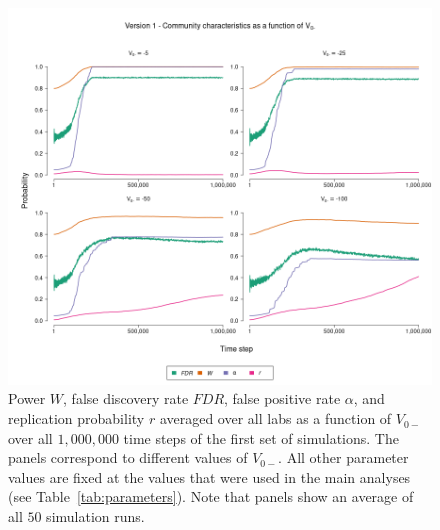 \documentclass[meta, authordate]{jote-new-article}
\begin{document}
%
%
\begin{figure}
  \begin{fullwidth}
    \centering
    \includegraphics[width=\textwidth]{v1_cha_plot_vnm.png}
    \caption{Power $W$, false discovery rate $FDR$, false positive rate $\alpha$, and replication probability $r$ averaged over all labs as a function of $V_{0-}$ over all $1,000,000$ time steps of the first set of simulations. The panels correspond to different values of $V_{0-}$. All other parameter values are fixed at the values that were used in the main analyses (see Table~\ref{tab:parameters}). Note that panels show an average of all $50$ simulation runs.}
    \label{fig:v1_cha_plot_vnm}
  \end{fullwidth}
\end{figure}
%
\end{document}
